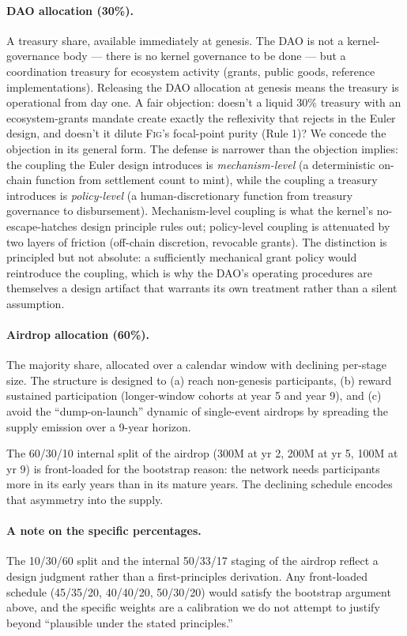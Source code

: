 \documentclass[11pt,a4paper]{article}
\theoremstyle{definition}
\theoremstyle{remark}
\newcommand{\fig}{\textsc{Fig}}
\begin{document}
\paragraph{DAO allocation (30\%).}
A treasury share, available immediately at genesis. The DAO is
not a kernel-governance body --- there is no kernel governance to
be done --- but a coordination treasury for ecosystem activity
(grants, public goods, reference implementations). Releasing the
DAO allocation at genesis means the treasury is operational from
day one. A fair objection: doesn't a liquid 30\% treasury with
an ecosystem-grants mandate create exactly the reflexivity that
 rejects in the Euler design, and doesn't it
dilute \fig{}'s focal-point purity (Rule 1)? We concede the
objection in its general form. The defense is narrower than the
objection implies: the coupling the Euler design introduces is
\emph{mechanism-level} (a deterministic on-chain function from
settlement count to mint), while the coupling a treasury
introduces is \emph{policy-level} (a human-discretionary
function from treasury governance to disbursement).
Mechanism-level coupling is what the kernel's no-escape-hatches
design principle rules out; policy-level coupling is attenuated
by two layers of friction (off-chain discretion, revocable
grants). The distinction is principled but not absolute: a
sufficiently mechanical grant policy would reintroduce the
coupling, which is why the DAO's operating procedures are
themselves a design artifact that warrants its own treatment
rather than a silent assumption.

\paragraph{Airdrop allocation (60\%).}
The majority share, allocated over a calendar window with
declining per-stage size. The structure is designed to (a) reach
non-genesis participants, (b) reward sustained participation
(longer-window cohorts at year 5 and year 9), and (c) avoid the
``dump-on-launch'' dynamic of single-event airdrops by spreading
the supply emission over a 9-year horizon.

The 60/30/10 internal split of the airdrop (300M at yr 2, 200M
at yr 5, 100M at yr 9) is front-loaded for the bootstrap
reason: the network needs participants more in its early years
than in its mature years. The declining schedule encodes that
asymmetry into the supply.

\paragraph{A note on the specific percentages.}
The 10/30/60 split and the internal 50/33/17 staging of the
airdrop reflect a design judgment rather than a first-principles
derivation. Any front-loaded schedule (45/35/20, 40/40/20,
50/30/20) would satisfy the bootstrap argument above, and the
specific weights are a calibration we do not attempt to justify
beyond ``plausible under the stated principles.''
\end{document}
